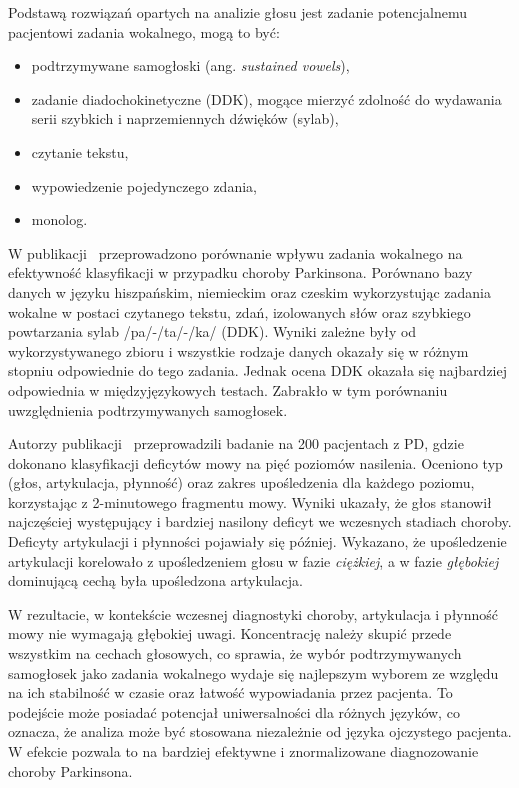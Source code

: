Podstawą rozwiązań opartych na analizie głosu jest zadanie potencjalnemu pacjentowi zadania wokalnego, mogą to być:
\begin{itemize}[itemsep=0.1pt]
	\item podtrzymywane samogłoski (ang. \emph{sustained vowels}),
	\item zadanie diadochokinetyczne (DDK), mogące mierzyć zdolność do wydawania serii szybkich i naprzemiennych dźwięków (sylab),
	\item czytanie tekstu,
	\item wypowiedzenie pojedynczego zdania,
	\item monolog.
\end{itemize}


W publikacji~\cite{vocal-tasks} przeprowadzono porównanie wpływu zadania wokalnego na efektywność klasyfikacji w przypadku choroby Parkinsona.
Porównano bazy danych w języku hiszpańskim, niemieckim oraz czeskim wykorzystując zadania wokalne w postaci czytanego tekstu, zdań, izolowanych słów oraz szybkiego powtarzania sylab /pa/-/ta/-/ka/ (DDK).
Wyniki zależne były od wykorzystywanego zbioru i wszystkie rodzaje danych okazały się w różnym stopniu odpowiednie do tego zadania.
Jednak ocena DDK okazała się najbardziej odpowiednia w międzyjęzykowych testach.
Zabrakło w tym porównaniu uwzględnienia podtrzymywanych samogłosek.

Autorzy publikacji~\cite{monitoring_speech} przeprowadzili badanie na 200 pacjentach z PD,
gdzie dokonano klasyfikacji deficytów mowy na pięć poziomów nasilenia.
Oceniono typ (głos, artykulacja, płynność) oraz zakres upośledzenia dla każdego poziomu, korzystając z 2-minutowego fragmentu mowy.
Wyniki ukazały, że głos stanowił najczęściej występujący i bardziej nasilony deficyt we wczesnych stadiach choroby.
Deficyty artykulacji i płynności pojawiały się później.
Wykazano, że upośledzenie artykulacji korelowało z upośledzeniem głosu w fazie \emph{ciężkiej}, a w fazie \emph{głębokiej} dominującą cechą była upośledzona artykulacja.

W rezultacie, w kontekście wczesnej diagnostyki choroby, artykulacja i płynność mowy nie wymagają głębokiej uwagi.
Koncentrację należy skupić przede wszystkim na cechach głosowych, co sprawia, że wybór podtrzymywanych samogłosek jako zadania wokalnego
wydaje się najlepszym wyborem ze względu na ich stabilność w czasie oraz łatwość wypowiadania przez pacjenta.
To podejście może posiadać potencjał uniwersalności dla różnych języków, co oznacza, że analiza może być stosowana
niezależnie od języka ojczystego pacjenta.
W efekcie pozwala to na bardziej efektywne i znormalizowane diagnozowanie choroby Parkinsona.

